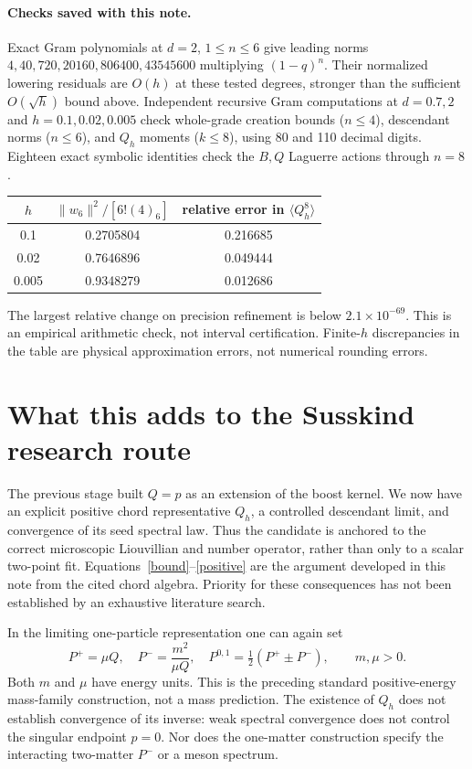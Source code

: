 \documentclass[11pt,a4paper]{article}
\newcommand{\norm}[1]{\lVert#1\rVert}
\begin{document}
\paragraph{Checks saved with this note.}
Exact Gram polynomials at $d=2$, $1\le n\le6$ give leading norms
$4,40,720,20160,806400,43545600$ multiplying $(1-q)^n$.
Their normalized lowering residuals are $O(h)$ at these tested
degrees, stronger than the sufficient $O(\sqrt h)$ bound above.
Independent recursive Gram computations at $d=0.7,2$ and
$h=0.1,0.02,0.005$ check whole-grade creation bounds ($n\le4$),
descendant norms ($n\le6$), and $Q_h$ moments ($k\le8$), using
80 and 110 decimal digits. Eighteen exact symbolic identities check
the $B,Q$ Laguerre actions through $n=8$.
\begin{center}
\begin{tabular}{ccc}\toprule
$h$ & $\norm{w_6}^2/[6!(4)_6]$ & relative error in $\langle Q_h^8\rangle$\\
\midrule
0.1 & 0.2705804 & 0.216685\\
0.02 & 0.7646896 & 0.049444\\
0.005 & 0.9348279 & 0.012686\\\bottomrule
\end{tabular}
\end{center}
The largest relative change on precision refinement is below
$2.1\times10^{-69}$. This is an empirical arithmetic check, not
interval certification. Finite-$h$ discrepancies in the table are
physical approximation errors, not numerical rounding errors.

\newpage
\section{What this adds to the Susskind research route}
The previous stage built $Q=p$ as an extension of the boost kernel.
We now have an explicit positive chord representative $Q_h$, a
controlled descendant limit, and convergence of its seed spectral
law. Thus the candidate is anchored to the correct microscopic
Liouvillian and number operator, rather than only to a scalar
two-point fit. Equations~\eqref{bound}--\eqref{positive} are the
argument developed in this note from the cited chord algebra.
Priority for these consequences has not been established by an
exhaustive literature search.

In the limiting one-particle representation one can again set
\begin{equation}
 P^+=\mu Q,\quad P^-=\frac{m^2}{\mu Q},\quad
 P^{0,1}=\tfrac12(P^+\pm P^-),\qquad m,\mu>0.
\end{equation}
Both $m$ and $\mu$ have energy units. This is the preceding standard
positive-energy mass-family construction, not a mass prediction.
The existence of $Q_h$ does not establish convergence of its inverse:
weak spectral convergence does not control the singular endpoint
$p=0$. Nor does the one-matter construction specify the interacting
two-matter $P^-$ or a meson spectrum.
\end{document}
